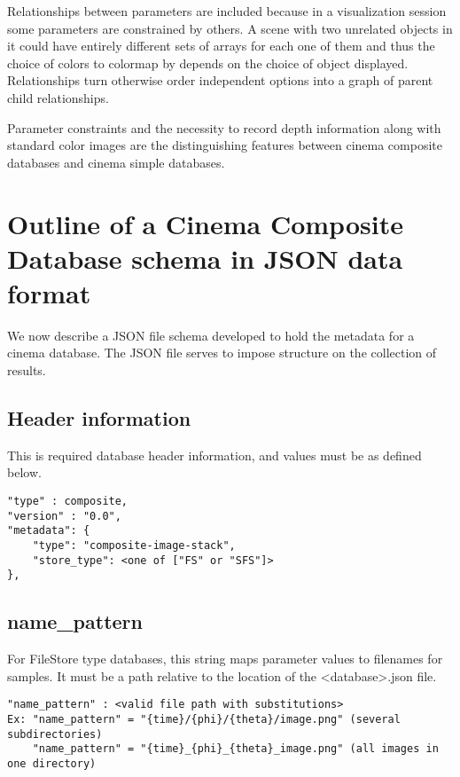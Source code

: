 \documentclass{article}
\begin{document}
Relationships between parameters are included because in a visualization session some parameters are constrained by others. A scene with two unrelated objects in it could have entirely different sets of arrays for each one of them and thus the choice of colors to colormap by depends on the choice of object displayed. Relationships turn otherwise order independent options into a graph of parent child relationships.

Parameter constraints and the necessity to record depth information along with standard color images are the distinguishing features between cinema composite databases and cinema simple databases.

\section{Outline of a Cinema Composite Database schema in JSON data format}
We now describe a JSON file schema developed to hold the metadata for a cinema database. The JSON file serves to impose structure on the collection of results.

\subsection{Header information}
                    
This is required database header information, and values must be as defined below.

\begin{verbatim}
"type" : composite,
"version" : "0.0",
"metadata": {
    "type": "composite-image-stack",
    "store_type": <one of ["FS" or "SFS"]>
},
\end{verbatim}

\subsection{name\_pattern}

For FileStore type databases, this string maps parameter values to filenames for samples. It must be a path relative to the location of the <database>.json file.

\begin{verbatim}
"name_pattern" : <valid file path with substitutions>                   
Ex: "name_pattern" = "{time}/{phi}/{theta}/image.png" (several subdirectories)
    "name_pattern" = "{time}_{phi}_{theta}_image.png" (all images in one directory)
\end{verbatim}
\end{document}
